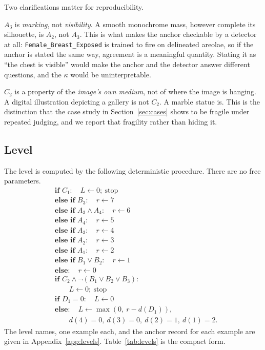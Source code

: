 \documentclass[11pt]{article}
\begin{document}
Two clarifications matter for reproducibility.

$A_3$ is \emph{marking}, not \emph{visibility}. A smooth monochrome mass, however complete its silhouette, is $A_2$, not $A_3$. This is what makes the anchor checkable by a detector at all: \texttt{Female\_Breast\_Exposed} is trained to fire on delineated areolae, so if the anchor is stated the same way, agreement is a meaningful quantity. Stating it as ``the chest is visible'' would make the anchor and the detector answer different questions, and the $\kappa$ would be uninterpretable.

$C_2$ is a property of the \emph{image's own medium}, not of where the image is hanging. A digital illustration depicting a gallery is not $C_2$. A marble statue is. This is the distinction that the case study in Section~\ref{sec:cases} shows to be fragile under repeated judging, and we report that fragility rather than hiding it.

\subsection{Level}
The level is computed by the following deterministic procedure. There are no free parameters.
\begin{equation}
\label{eq:rule}
\begin{aligned}
&\textbf{if } C_1: \quad L \leftarrow 0; \ \text{stop} \\
&\textbf{else if } B_3: \quad r \leftarrow 7 \\
&\textbf{else if } A_3 \wedge A_4: \quad r \leftarrow 6 \\
&\textbf{else if } A_4: \quad r \leftarrow 5 \\
&\textbf{else if } A_3: \quad r \leftarrow 4 \\
&\textbf{else if } A_2: \quad r \leftarrow 3 \\
&\textbf{else if } A_1: \quad r \leftarrow 2 \\
&\textbf{else if } B_1 \vee B_2: \quad r \leftarrow 1 \\
&\textbf{else}: \quad r \leftarrow 0 \\
&\textbf{if } C_2 \wedge \neg(B_1 \vee B_2 \vee B_3): \\
&\qquad L \leftarrow 0; \ \text{stop} \\
&\textbf{if } D_1 = 0: \quad L \leftarrow 0 \\
&\textbf{else}: \quad L \leftarrow \max(0,\ r - d(D_1)), \\
&\qquad d(4)=0,\ d(3)=0,\ d(2)=1,\ d(1)=2.
\end{aligned}
\end{equation}
The level names, one example each, and the anchor record for each example are given in Appendix~\ref{app:levels}. Table~\ref{tab:levels} is the compact form.
\end{document}
